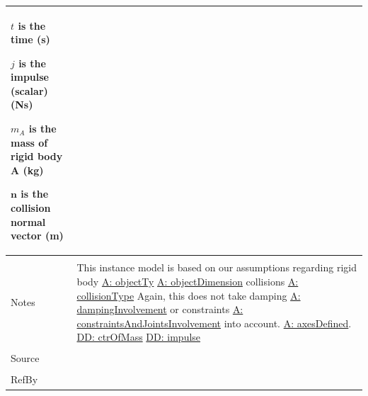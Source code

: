 \documentclass[12pt]{article}
\begin{document}
\begin{minipage}{\textwidth}
\begin{tabular}{p{} p{}}
\begin{symbDescription}
              \item{$t$ is the time (s)}
              \item{$j$ is the impulse (scalar) (Ns)}
              \item{${m_{A}}$ is the mass of rigid body A (kg)}
              \item{$\mathbf{n}$ is the collision normal vector (m)}
              \end{symbDescription}
\\ \midrule \\
Notes & This instance model is based on our assumptions regarding rigid body \hyperref[A:objectTy]{A: objectTy} \hyperref[A:objectDimension]{A: objectDimension} collisions \hyperref[A:collisionType]{A: collisionType} Again, this does not take damping \hyperref[A:dampingInvolvement]{A: dampingInvolvement} or constraints \hyperref[A:constraintsAndJointsInvolvement]{A: constraintsAndJointsInvolvement} into account. \hyperref[A:axesDefined]{A: axesDefined}. \hyperref[DD:ctrOfMass]{DD: ctrOfMass} \hyperref[DD:impulse]{DD: impulse}
\\ \midrule \\
Source & 
\\ \midrule \\
RefBy & 
\\ \bottomrule \end{tabular}
\end{minipage}\\
\end{document}
